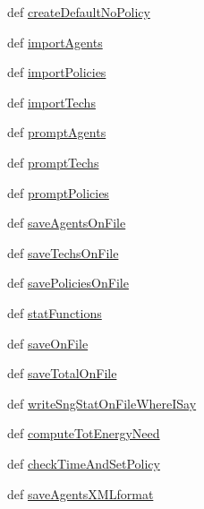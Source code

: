 \begin{DoxyCompactItemize}
\item 
def \hyperlink{classenv_1_1environment_a85eefcdeafbac7ab085ceaa010554e53}{create\-Default\-No\-Policy}
\item 
def \hyperlink{classenv_1_1environment_a220a8c517485f209a5b6f755050119ef}{import\-Agents}
\item 
def \hyperlink{classenv_1_1environment_a43518d172adebc6a2a4a9e398611bc01}{import\-Policies}
\item 
def \hyperlink{classenv_1_1environment_aa5ede58f5354215a57f923af714e562c}{import\-Techs}
\item 
def \hyperlink{classenv_1_1environment_aace60cd59f4c9ff256a382ed42cc036d}{prompt\-Agents}
\item 
def \hyperlink{classenv_1_1environment_ae102918add9b770b5d809754eaa8c60f}{prompt\-Techs}
\item 
def \hyperlink{classenv_1_1environment_aa57e04e3ad410983e6092d792bad5df2}{prompt\-Policies}
\item 
def \hyperlink{classenv_1_1environment_ab4da69e7299c1c6cab910bb25a038e07}{save\-Agents\-On\-File}
\item 
def \hyperlink{classenv_1_1environment_a174b993db464e76da248f9748a782f64}{save\-Techs\-On\-File}
\item 
def \hyperlink{classenv_1_1environment_a336d03c5cad79bee4524022a0d794ede}{save\-Policies\-On\-File}
\item 
def \hyperlink{classenv_1_1environment_a9ee71e7952bd213af61a03ea668d1bdc}{stat\-Functions}
\item 
def \hyperlink{classenv_1_1environment_ab6f1f8b6ef0ae847d522dd0051128471}{save\-On\-File}
\item 
def \hyperlink{classenv_1_1environment_a32f455199d92d3c927f04447f19009d7}{save\-Total\-On\-File}
\item 
def \hyperlink{classenv_1_1environment_a90ee236cf54c38ccfef6a697ee56d8a4}{write\-Sng\-Stat\-On\-File\-Where\-I\-Say}
\item 
def \hyperlink{classenv_1_1environment_a4798222d8254cd4756d79bc99a21daaf}{compute\-Tot\-Energy\-Need}
\item 
def \hyperlink{classenv_1_1environment_a7c59128e649fcfedf0f8e03912074090}{check\-Time\-And\-Set\-Policy}
\item 
def \hyperlink{classenv_1_1environment_ac96b64177b2746ac4caa95be46b12003}{save\-Agents\-X\-M\-Lformat}
\end{DoxyCompactItemize}
